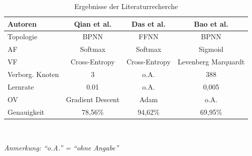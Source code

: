 \documentclass{scrartcl}
\begin{document}
\begin{table}[h!]
   \centering
   \caption{Ergebnisse der Literaturrecherche}
   \begin{tabular}{lccc} \toprule
      Autoren         & Qian et al. \cite{qian} & Das et al.  \cite{das} & Bao et al. \cite{bao} \\ \midrule
      Topologie       & BPNN                    & FFNN                   & BPNN                  \\
      AF              & Softmax                 & Softmax                & Sigmoid               \\
      VF              & Cross-Entropy           & Cross-Entropy          & Levenberg Marquardt   \\
      Verborg. Knoten & $3$                     & o.A.                   & $388$                 \\
      Lernrate        & 0.01                    & o.A.                   & 0,005                 \\
      OV              & Gradient Descent        & Adam                   & o.A.                  \\
      Genauigkeit     & 78,56\%                 & 94,62\%                & 69,95\%               \\
      \bottomrule
   \end{tabular}
   \label{tab1}
   \medskip \\
   {\raggedright \textit{Anmerkung: \enquote{o.A.} = \enquote{ohne Angabe}} \par}
\end{table}
\end{document}
